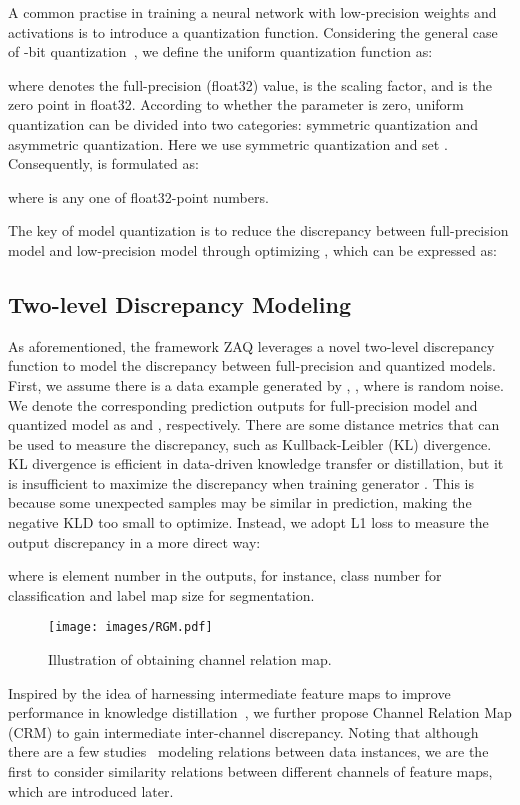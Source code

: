 \documentclass[final]{cvpr}
\begin{document}
A common practise in training a neural network with low-precision weights and activations is to introduce a quantization function. Considering the general case of -bit quantization~\cite{zhou2016dorefa}, we define the uniform quantization function  as:

where  denotes the full-precision (float32) value,  is the scaling factor, and  is the zero point in float32. According to whether the parameter  is zero, uniform quantization can be divided into two categories: symmetric quantization and asymmetric quantization.
Here we use symmetric quantization and set . 
Consequently,  is formulated as:

where  is any one of float32-point numbers.

The key of model quantization is to reduce the discrepancy  between full-precision model  and low-precision model  through optimizing , which can be expressed as:



\subsection{Two-level Discrepancy Modeling}

As aforementioned, the framework ZAQ leverages a novel two-level discrepancy function to model the discrepancy between full-precision and quantized models.
First, we assume there is a data example  generated by , \ie,  where  is random noise.
We denote the corresponding prediction outputs for full-precision model  and quantized model  as  and , respectively. There are some distance metrics that can be used to measure the discrepancy, such as Kullback-Leibler (KL) divergence.
KL divergence is efficient in data-driven knowledge transfer or distillation, but it is insufficient to maximize the discrepancy when training generator .
This is because some unexpected samples may be similar in prediction, making the negative KLD too small to optimize.
Instead, we adopt L1 loss to measure the output discrepancy  in a more direct way:

where  is element number in the outputs, for instance, class number for classification and label map size for segmentation. 

\begin{figure}[!t]
  \centering
  \texttt{[image: images/RGM.pdf]}
  \caption{Illustration of obtaining channel relation map.}
  \label{fig:RGM}
\end{figure}

Inspired by the idea of harnessing intermediate feature maps to improve performance in knowledge distillation~\cite{zagoruyko2016paying,park2019relational}, we further propose Channel Relation Map (CRM) to gain intermediate inter-channel discrepancy.
Noting that although there are a few studies~\cite{park2019relational,liu2019knowledge} modeling relations between data instances, we are the first to consider similarity relations between different channels of feature maps, which are introduced later.
\end{document}
